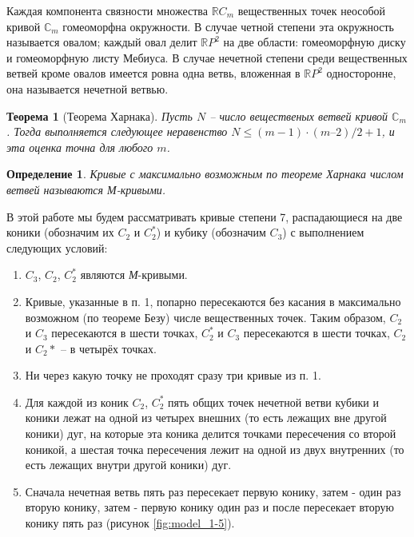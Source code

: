 \documentclass[14pt]{article}
\newtheorem{theorem}{Теорема}
\newtheorem{definition}{Определение}
\begin{document}
Каждая компонента связности множества  $\mathbb RC_m$ вещественных точек неособой кривой $\mathbb C_m$ гомеоморфна окружности. В случае четной степени эта окружность называется овалом; каждый овал делит $\mathbb RP^2$ на две области: гомеоморфную диску и гомеоморфную листу Мебиуса. В случае нечетной степени среди вещественных ветвей кроме овалов имеется ровна одна ветвь, вложенная в $\mathbb RP^2$ односторонне, она называется нечетной ветвью.

\begin{theorem}[Теорема Харнака]
Пусть $N$ -- число вещественых ветвей кривой $\mathbb C_m$. Тогда выполняется следующее неравенство $N \leqslant (m-1) \cdot (m – 2)/2 + 1$, и эта оценка точна для любого $m$.
\end{theorem}

\begin{definition}
Кривые с максимально возможным по теореме Харнака числом ветвей называются М-кривыми.
\end{definition}

В этой работе мы будем рассматривать кривые степени 7, распадающиеся на две коники (обозначим их $C_2$ и $C_2^*$) и кубику (обозначим $C_3$) с выполнением следующих условий:

\begin{enumerate}
\item $C_3$, $C_2$, $C_2^*$ являются \textit{М}-кривыми.
\item Кривые, указанные в п. 1, попарно пересекаются без касания в максимально возможном (по теореме Безу) числе вещественных точек. Таким образом, $C_2$ и $C_3$ пересекаются в шести точках, $C_2^*$ и $C_3$ пересекаются в шести точках, $C_2$ и $C_2*$ – в  четырёх точках. 
\item Ни через какую точку не проходят сразу три кривые из п. 1.
\item Для каждой из коник $C_2$, $C_2^*$ пять общих точек нечетной ветви кубики и коники лежат на одной из четырех внешних (то есть лежащих вне другой коники) дуг, на которые эта коника делится точками пересечения со второй коникой, а шестая точка пересечения лежит на одной из двух внутренних (то есть лежащих внутри другой коники) дуг.
\item Сначала нечетная ветвь пять раз пересекает первую конику, затем - один раз вторую конику, затем - первую конику один раз  и после пересекает вторую конику пять раз (рисунок \ref{fig:model_1-5}).
\end{enumerate}
\end{document}
